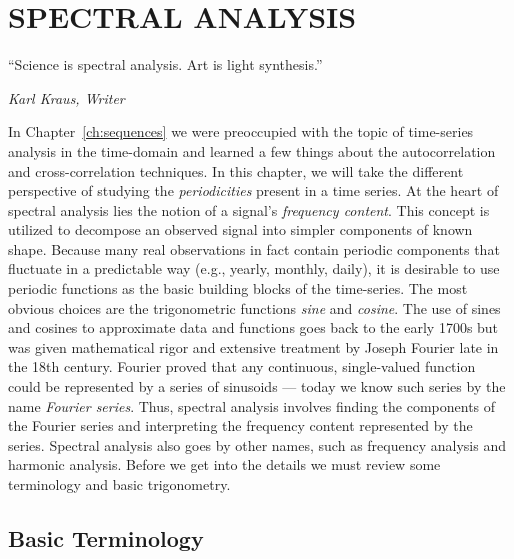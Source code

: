 %
\chapter{SPECTRAL ANALYSIS}
\label{ch:spectralanallysis}
\epigraph{``Science is spectral analysis. Art is light synthesis.''}{\textit{Karl Kraus, Writer}}

	In Chapter~\ref{ch:sequences} we were preoccupied with the topic of time-series analysis in the time-domain 
and learned a few things about the autocorrelation and cross-correlation techniques.  
In this chapter, we will take the different perspective of studying the \emph{periodicities} present in a time 
series.
	At the heart of spectral analysis lies the notion of a signal's \emph{frequency content}.  This concept is 
utilized to decompose an observed signal into simpler components of known shape.  Because many real 
observations in fact contain periodic components that fluctuate in a predictable way (e.g., yearly, monthly, 
daily), it is desirable to use periodic functions as the basic building blocks of the time-series.  
The most obvious choices are the trigonometric functions \emph{sine} and \emph{cosine}.
	The use of sines and cosines to approximate data and functions goes back to the early 1700s 
but was given mathematical rigor and extensive treatment by Joseph Fourier late in the 18th century.  
Fourier proved that any continuous, single-valued function could be represented by a series of 
sinusoids --- today we know such series by the name \emph{Fourier series}.  Thus, spectral analysis 
involves finding the components of the Fourier series and interpreting the frequency content 
represented by the series.  Spectral analysis also goes by other names, such as frequency analysis and 
harmonic analysis.  Before we get into the details we must review some terminology and basic 
trigonometry.

\section{Basic Terminology}

